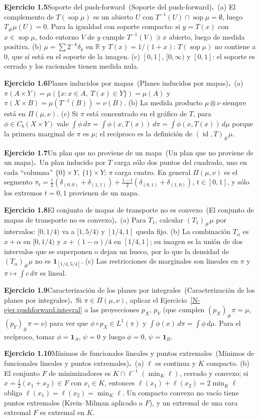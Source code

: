 \documentclass[11pt,a4paper]{amsart}
\newcommand{\id}{\operatorname{id}}
\def\sop{\operatorname {\mathrm{sop}}}
\newcommand{\R}{{\mathbb R}}
\newcommand{\I}{{\mathbf 1}}
\theoremstyle{remark}
\theoremstyle{definition}
\numberwithin{subsection}{section}
\numberwithin{equation}{section}
\newcommand{\ejlabel}[2]{\par\medskip\noindent\textbf{Ejercicio #1}\ifx\relax#2\relax\else\ (#2)\fi\textbf{.}\ }
\begin{document}
\ejlabel{1.5}{Soporte del push-forward}(a) El complemento de $\overline{T(\sop\mu)}$ es un abierto $U$ con $T^{-1}(U)\cap\sop\mu=\emptyset$, luego $T_\#\mu(U)=0$. Para la igualdad con soporte compacto: si $y=T(x)$ con $x\in\sop\mu$, todo entorno $V$ de $y$ cumple $T^{-1}(V)\ni x$ abierto, luego de medida positiva. (b) $\mu=\sum2^{-k}\delta_k$ en $\R$ y $T(x)=1/(1+x)$: $T(\sop\mu)$ no contiene a $0$, que sí está en el soporte de la imagen. (c) $[0,1]$, $[0,\infty)$ y $[0,1]$: el soporte es cerrado y los racionales tienen medida nula.

\ejlabel{1.6}{Planes inducidos por mapas}(a) $\pi(A\times Y)=\mu(\{x:x\in A,\ T(x)\in Y\})=\mu(A)$ y $\pi(X\times B)=\mu(T^{-1}(B))=\nu(B)$. (b) La medida producto $\mu\otimes\nu$ siempre está en $\Pi(\mu,\nu)$. (c) Si $\pi$ está concentrado en el gráfico de $T$, para $\phi\in C_b(X\times Y)$ vale $\int\phi\,d\pi=\int\phi(x,T(x))\,d\pi=\int\phi(x,T(x))\,d\mu$ porque la primera marginal de $\pi$ es $\mu$; el recíproco es la definición de $(\id,T)_\#\mu$.

\ejlabel{1.7}{Un plan que no proviene de un mapa}Un plan inducido por $T$ carga sólo dos puntos del cuadrado, uno en cada ``columna'' $\{0\}\times Y$, $\{1\}\times Y$; $\pi$ carga cuatro. En general $\Pi(\mu,\nu)$ es el segmento $\pi_t=\frac t2(\delta_{(0,0)}+\delta_{(1,1)})+\frac{1-t}2(\delta_{(0,1)}+\delta_{(1,0)})$, $t\in[0,1]$, y sólo los extremos $t=0,1$ provienen de un mapa.

\ejlabel{1.8}{El conjunto de mapas de transporte no es convexo}(a) Para $T_1$, calcular $(T_1)_\#\mu$ por intervalos: $[0,1/4)$ va a $[1,5/4)$ y $[1/4,1]$ queda fijo. (b) La combinación $T_\alpha$ es $x+\alpha$ en $[0,1/4)$ y $x+(1-\alpha)/4$ en $[1/4,1]$; su imagen es la unión de dos intervalos que se superponen o dejan un hueco, por lo que la densidad de $(T_\alpha)_\#\mu$ no es $\I_{[1/4,5/4]}$. (c) Las restricciones de marginales son lineales en $\pi$ y $\pi\mapsto\int c\,d\pi$ es lineal.

\ejlabel{1.9}{Caracterización de los planes por integrales}Si $\pi\in\Pi(\mu,\nu)$, aplicar el Ejercicio~\ref{N-ejer.pushforward.integral} a las proyecciones $p_X$, $p_Y$ (que cumplen $(p_X)_\#\pi=\mu$, $(p_Y)_\#\pi=\nu$) para ver que $\phi\circ p_X\in L^1(\pi)$ y $\int\phi(x)\,d\pi=\int\phi\,d\mu$. Para el recíproco, tomar $\phi=\I_A$, $\psi=0$ y luego $\phi=0$, $\psi=\I_B$.

\ejlabel{1.10}{Mínimos de funcionales lineales y puntos extremales}(a) $\ell$ es continua y $K$ compacto. (b) El conjunto $F$ de minimizadores es $K\cap\ell^{-1}(\min_K\ell)$, cerrado y convexo; si $x=\frac12(x_1+x_2)\in F$ con $x_i\in K$, entonces $\ell(x_1)+\ell(x_2)=2\min_K\ell$ obliga $\ell(x_1)=\ell(x_2)=\min_K\ell$. Un compacto convexo no vacío tiene puntos extremales (Krein--Milman aplicado a $F$), y un extremal de una cara extremal $F$ es extremal en $K$.
\end{document}
